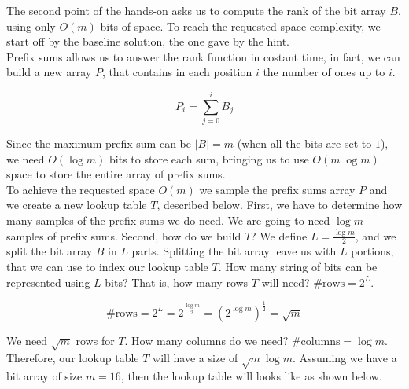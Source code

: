 \documentclass{article}
\begin{document}
The second point of the hands-on asks us to compute the rank of the bit array $B$, using only $O(m)$ bits of space. To reach the requested space complexity,
we start off by the baseline solution, the one gave by the hint.\\

\noindent Prefix sums allows us to answer the rank function in costant time, in fact, we can build a new array $P$, that contains in each position $i$ the number of ones
up to $i$.

\begin{equation}
    P_i = \sum_{j = 0}^{i} B_j
\end{equation}

\noindent Since the maximum prefix sum can be $|B| = m$ (when all the bits are set to $1$), we need $O(\log m)$ bits to store each sum, bringing us to use
$O(m \log m)$ space to store the entire array of prefix sums.\\

\noindent To achieve the requested space $O(m)$ we sample the prefix sums array $P$ and we create a new lookup table $T$, described below. First, we have to determine how many samples
of the prefix sums we do need. We are going to need $\log m$ samples of prefix sums. Second, how do we build $T$? We define $L = \frac{\log m}{2}$, and we split the bit array $B$
in $L$ parts. Splitting the bit array leave us with $L$ portions, that we can use to index our lookup table $T$. 
How many string of bits can be represented using $L$ bits? That is, how many rows $T$ will need? $\#\textrm{rows} = 2^L$.

\begin{equation}
    \textrm{\#rows} = 2^L = 2^{\frac{\log m}{2}} = (2^{\log m})^{\frac{1}{2}} = \sqrt m
\end{equation}

\noindent We need $\sqrt m$ rows for $T$. How many columns do we need? $\# \textrm{columns} = \log m$. Therefore, our lookup table $T$ will have a size of $\sqrt m \log m$. Assuming we have a bit array of size 
$m = 16$, then the lookup table will looks like as shown below.
\end{document}
